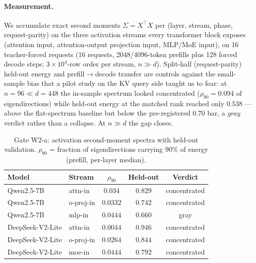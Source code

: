 \documentclass[11pt]{article}
\renewcommand{\_}{\WCorigunderscore\allowbreak}
\begin{document}
\paragraph{Measurement.} We accumulate exact second moments
$\Sigma=X^\top X$ per (layer, stream, phase, request-parity) on the
three activation streams every transformer block exposes (attention
input, attention-output projection input, MLP/MoE input), on 16
teacher-forced requests (16 requests, 2048/4096-token prefills plus 128 forced decode steps; $3\times 10^4$-row order per stream, $n\gg d$). Split-half
(request-parity) held-out energy and prefill$\to$decode transfer are
controls against the small-sample bias that a pilot study on the KV
query side taught us to fear: at $n=96\ll d=448$ the in-sample
spectrum looked concentrated ($\rho_{90}=0.094$ of eigendirections) while
held-out energy at the matched rank reached only $0.538$ --- above the
flat-spectrum baseline but below the pre-registered $0.70$ bar, a
\emph{gray} verdict rather than a collapse. At $n\gg d$ the gap closes.

\begin{table}[h]\centering\small
\begin{tabular}{llccc}
\toprule
Model & Stream & $\rho_{90}$ & Held-out & Verdict\\
\midrule
Qwen2.5-7B & attn-in & $0.034$ & $0.829$ & concentrated\\
Qwen2.5-7B & o-proj-in & $0.0332$ & $0.742$ & concentrated\\
Qwen2.5-7B & mlp-in & $0.0444$ & $0.660$ & gray\\
DeepSeek-V2-Lite & attn-in & $0.0044$ & $0.946$ & concentrated\\
DeepSeek-V2-Lite & o-proj-in & $0.0264$ & $0.844$ & concentrated\\
DeepSeek-V2-Lite & moe-in & $0.0444$ & $0.792$ & concentrated\\
\bottomrule
\end{tabular}
\caption{Gate W2-a: activation second-moment spectra with held-out
validation. $\rho_{90}$ = fraction of eigendirections carrying $90\%$
of energy (prefill, per-layer median).}
\label{tab:w2a}
\end{table}
\end{document}
